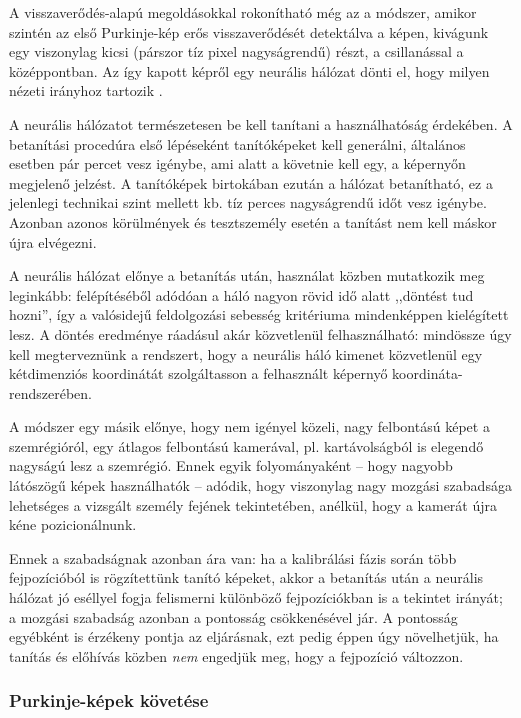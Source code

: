 \bigskip

A visszaverődés-alapú megoldásokkal rokonítható még az a módszer, amikor szintén az első Purkinje-kép erős visszaverődését detektálva a képen, kivágunk egy viszonylag kicsi (párszor tíz pixel nagyságrendű) részt, a csillanással a középpontban. Az így kapott képről egy neurális hálózat dönti el, hogy milyen nézeti irányhoz tartozik \cite{baluja}.

A neurális hálózatot természetesen be kell tanítani a használhatóság érdekében. A betanítási procedúra első lépéseként tanítóképeket kell generálni, általános esetben pár percet vesz igénybe, ami alatt a követnie kell egy, a képernyőn megjelenő jelzést. A tanítóképek birtokában ezután a hálózat betanítható, ez a jelenlegi technikai szint mellett kb. tíz perces nagyságrendű időt vesz igénybe. Azonban azonos körülmények és tesztszemély esetén a tanítást nem kell máskor újra elvégezni.

A neurális hálózat előnye a betanítás után, használat közben mutatkozik meg leginkább: felépítéséből adódóan a háló nagyon rövid idő alatt ,,döntést tud hozni'', így a valósidejű feldolgozási sebesség kritériuma mindenképpen kielégített lesz. A döntés eredménye ráadásul akár közvetlenül felhasználható: mindössze úgy kell megterveznünk a rendszert, hogy a neurális háló kimenet közvetlenül egy kétdimenziós koordinátát szolgáltasson a felhasznált képernyő koordináta-rendszerében.

A módszer egy másik előnye, hogy nem igényel közeli, nagy felbontású képet a szemrégióról, egy átlagos felbontású kamerával, pl. kartávolságból is elegendő nagyságú lesz a szemrégió. Ennek egyik folyományaként -- hogy nagyobb látószögű képek használhatók -- adódik, hogy viszonylag nagy mozgási szabadsága lehetséges a vizsgált személy fejének tekintetében, anélkül, hogy a kamerát újra kéne pozicionálnunk.

Ennek a szabadságnak azonban ára van: ha a kalibrálási fázis során több fejpozícióból is rögzítettünk tanító képeket, akkor a betanítás után a neurális hálózat jó eséllyel fogja felismerni különböző fejpozíciókban is a tekintet irányát; a mozgási szabadság azonban a pontosság csökkenésével jár. A pontosság egyébként is érzékeny pontja az eljárásnak, ezt pedig éppen úgy növelhetjük, ha tanítás és előhívás közben \emph{nem} engedjük meg, hogy a fejpozíció változzon.

\subsubsection{Purkinje-képek követése}\label{sect:purkinje}

